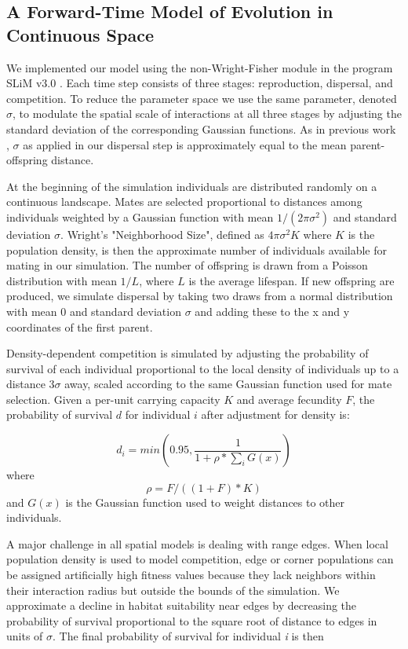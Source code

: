 \documentclass[11pt,twoside,lineno]{preprint}
\begin{document}
\subsection{A Forward-Time Model of Evolution in Continuous Space}

We implemented our model using the non-Wright-Fisher module in the program SLiM v3.0 \citep{Haller2019}. Each time step consists of three stages: reproduction, dispersal, and competition. To reduce the parameter space we use the same parameter, denoted $\sigma$, to modulate the spatial scale of interactions at all three stages by adjusting the standard deviation of the corresponding Gaussian functions. As in previous work \citep{Wright1943,Ringbauer2017}, $\sigma$ as applied in our dispersal step is approximately equal to the mean parent-offspring distance.  

At the beginning of the simulation individuals are distributed randomly on a continuous landscape. Mates are selected proportional to distances among individuals weighted by a Gaussian function with mean $1/(2\pi\sigma^2)$ and standard deviation $\sigma$. Wright's \cite{Wright1943} "Neighborhood Size", defined as $4\pi\sigma^2 K$ where $K$ is the population density, is then the approximate number of individuals available for mating in our simulation. The number of offspring is drawn from a Poisson distribution with mean $1/L$, where $L$ is the average lifespan. If new offspring are produced, we simulate dispersal by taking two draws from a normal distribution with mean 0 and standard deviation $\sigma$ and adding these to the x and y coordinates of the first parent. 

Density-dependent competition is simulated by adjusting the probability of survival of each individual proportional to the local density of individuals up to a distance $3\sigma$ away, scaled according to the same Gaussian function used for mate selection. Given a per-unit carrying capacity $K$ and average fecundity $F$, the probability of survival $d$ for individual $i$ after adjustment for density is:

\begin{equation}
    d_{i}=min(0.95,\frac{1}{1+\rho*\sum_{i}{G(x)}})
\end{equation}
where 
\begin{equation}
    \rho = F/((1+F)*K)
\end{equation} 
and $G(x)$ is the Gaussian function used to weight distances to other individuals. 

A major challenge in all spatial models is dealing with range edges. When local population density is used to model competition, edge or corner populations can be assigned artificially high fitness values because they lack neighbors within their interaction radius but outside the bounds of the simulation. We approximate a decline in habitat suitability near edges by decreasing the probability of survival proportional to the square root of distance to edges in units of $\sigma$. The final probability of survival for individual \textit{i} is then
\end{document}
